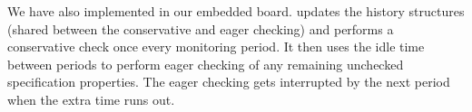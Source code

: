 %
%
%
%
%
We have also implemented \ha in our embedded board.
\ha updates the history structures (shared between
the conservative and eager checking) and
performs a conservative check once every monitoring period.
It then uses the idle time between periods to perform eager
checking of any remaining unchecked specification properties.
The eager checking gets interrupted  by the next period
when the extra time runs out.


%

